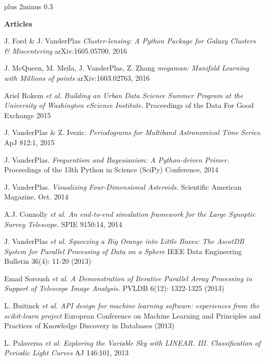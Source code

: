 \documentclass{article} %
\def\bf{\bfseries}
\def\sf{\sffamily}
\def\sl{\slshape}
\newlength\sidebarwidth
\newcommand{\smalltopic}[2]%
	 {\pagebreak[2]%
	 \vskip 1\baselineskip plus 2\baselineskip minus 0.3\baselineskip
	 \begin{minipage}{\textwidth}
         \phantomsection\addcontentsline{toc}{subsection}{#1}%
         \nopagebreak\hspace{0in}%
         \nopagebreak\begin{minipage}[t]{\sidebarwidth - .2cm}
         \raggedleft \bf\sf %
	 \textcolor{dark_blue}{\large #1}%
	 \end{minipage}%
	 \hfill
	 \begin{minipage}[t]{\linewidth - \sidebarwidth}
	 \nopagebreak{%
	    \rule{\linewidth}{.5pt}%
	    \vspace{.1\baselineskip}%
	    }%
	    #2
	 \end{minipage}
	 \end{minipage}}
\begin{document}
\smalltopic{\hspace*{-3ex} Articles}{
  \begin{itemize}[leftmargin=0ex, itemsep=0ex, parsep=.5ex, labelindent=-4ex]

    \publication
	  J. Ford \& J. VanderPlas
	  {\it Cluster-lensing: A Python Package for Galaxy Clusters \& Miscentering}
	  arXiv:1605.05700, 2016

    \publication
      J. McQueen, M. Meila, J. VanderPlas, Z. Zhang
      {\it megaman: Manifold Learning with Millions of points}
      arXiv:1603.02763, 2016

    \publication
      Ariel Rokem {\it et al.}
      {\it Building an Urban Data Science Summer Program at the University of Washington eScience Institute}.
      Proceedings of the Data For Good Exchange 2015

    \publication
      J. VanderPlas \& Z. Ivezic.
      {\it Periodograms for Multiband Astronomical Time Series.}
      ApJ 812:1, 2015

    \publication
      J. VanderPlas.
      {\it Frequentism and Bayesianism: A Python-driven Primer.}
      Proceedings of the 13th Python in Science (SciPy) Conference, 2014

    \publication
      J. VanderPlas.
      {\it Visualizing Four-Dimensional Asteroids.}
      Scientific American Magazine, Oct. 2014

    \publication
      A.J. Connolly {\it et al.}
      {\it An end-to-end simulation framework for the Large Synoptic Survey Telescope.}
      SPIE 9150:14, 2014

    \publication
      J. VanderPlas {\it et al.}
      {\it Squeezing a Big Orange into Little Boxes: The AscotDB System
        for Parallel Processing of Data on a Sphere}
      IEEE Data Engineering Bulletin 36(4): 11-20 (2013)

    \publication
      Emad Soroush {\it et al.}
      {\it A Demonstration of Iterative Parallel Array Processing in Support
        of Telescope Image Analysis.}
      PVLDB 6(12): 1322-1325 (2013)

    \publication
      L. Buitinck {\it et al.}
      {\it API design for machine learning software:
        experiences from the scikit-learn project}
      European Conference on Machine Learning and Principles and Practices
      of Knowledge Discovery in Databases (2013)

    \publication
      L. Palaversa {\sl et al.}
      {\sl Exploring the Variable Sky with LINEAR. III.
        Classification of Periodic Light Curves}
      AJ 146:101, 2013


\end{itemize}}
\end{document}
